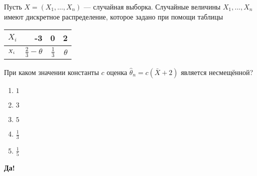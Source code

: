 \documentclass[t]{beamer}
\let\P\relax
\DeclareMathOperator{\P}{\mathbb{P}}
\begin{document}
 \begin{frame} \label{47-Yes} 
\begin{block}{47} 

Пусть $X = (X_1, \ldots , X_n)$ — случайная выборка. Случайные величины $X_1, ... , X_n$ имеют дискретное распределение, которое задано при помощи таблицы

\begin{center}
\begin{tabular}{lrrr} \toprule
$X_i$  & -3 & 0 & 2 \\
\midrule
$\P_{X_i}$ & $\frac{2}{3} - \theta$ & $\frac{1}{3}$ & $\theta$\\
\bottomrule
\end{tabular}
\end{center}

При каком значении константы $c$ оценка  $\hat{\theta}_n = c (\bar{X} + 2)$ является несмещённой?
  


 \end{block} 
\begin{enumerate} 
\item[] \hyperlink{47-No}{\beamergotobutton{} $1$}
\item[] \hyperlink{47-No}{\beamergotobutton{} $3$}
\item[] \hyperlink{47-No}{\beamergotobutton{} $5$}
\item[] \hyperlink{47-No}{\beamergotobutton{} $\frac{1}{3}$}
\item[] \hyperlink{47-Yes}{\beamergotobutton{} $\frac{1}{5}$}
\end{enumerate} 

 \textbf{Да!} 
 \hyperlink{48}{}\end{frame} 
\end{document}
